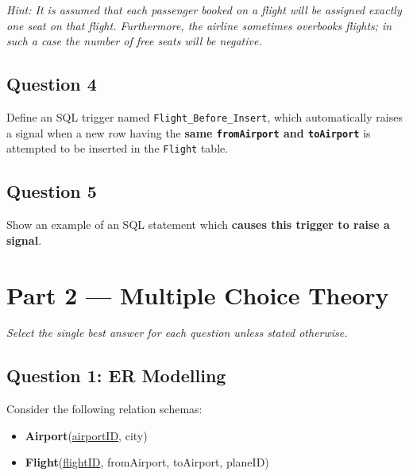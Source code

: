 \documentclass[12pt,a4paper]{article}
\begin{document}
\textit{Hint: It is assumed that each passenger booked on a flight will be assigned exactly one seat on that flight. Furthermore, the airline sometimes overbooks flights; in such a case the number of free seats will be negative.}

\vspace{2cm}

\subsection*{Question 4}
Define an SQL trigger named \texttt{Flight\_Before\_Insert}, which automatically raises a signal when a new row having the \textbf{same \texttt{fromAirport} and \texttt{toAirport}} is attempted to be inserted in the \texttt{Flight} table.

\vspace{2cm}

\subsection*{Question 5}
Show an example of an SQL statement which \textbf{causes this trigger to raise a signal}.

\vspace{2cm}

\newpage

\section*{Part 2 — Multiple Choice Theory}

\noindent\textit{Select the single best answer for each question unless stated otherwise.}

\vspace{1em}

\subsection*{Question 1: ER Modelling}

Consider the following relation schemas:

\begin{itemize}
  \item \textbf{Airport}(\underline{airportID}, city)
  \item \textbf{Flight}(\underline{flightID}, fromAirport, toAirport, planeID)
\end{itemize}
\end{document}
